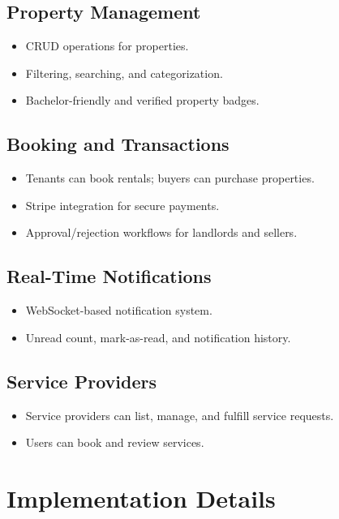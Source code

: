 \documentclass[12pt]{article}
\begin{document}
\subsection{Property Management}
\begin{itemize}
    \item CRUD operations for properties.
    \item Filtering, searching, and categorization.
    \item Bachelor-friendly and verified property badges.
\end{itemize}

\subsection{Booking and Transactions}
\begin{itemize}
    \item Tenants can book rentals; buyers can purchase properties.
    \item Stripe integration for secure payments.
    \item Approval/rejection workflows for landlords and sellers.
\end{itemize}

\subsection{Real-Time Notifications}
\begin{itemize}
    \item WebSocket-based notification system.
    \item Unread count, mark-as-read, and notification history.
\end{itemize}

\subsection{Service Providers}
\begin{itemize}
    \item Service providers can list, manage, and fulfill service requests.
    \item Users can book and review services.
\end{itemize}

\section{Implementation Details}
\end{document}
